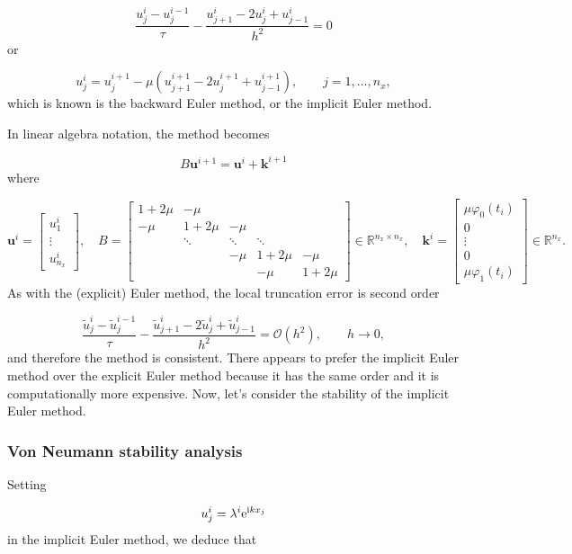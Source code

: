 \documentclass[12pt,a4paper]{article}
\begin{document}
\[
\frac{u^{i}_j - u^{i-1}_j}{\tau} - \frac{u^{i}_{j+1} - 2u^i_j + u^i_{j-1}}{h^2} = 0
\]
or

\[
u^{i}_j = u^{i+1}_j - \mu \left( u^{i+1}_{j+1} - 2u^{i+1}_j + u^{i+1}_{j-1}  \right), \qquad j = 1, \ldots, n_x,
\]
which is known is the backward Euler method, or the implicit Euler method.

In linear algebra notation, the method becomes

\[
B\mathbf{u}^{i+1} = \mathbf{u}^i + \mathbf{k}^{i+1}
\]
where

\[
\mathbf{u}^i = \begin{bmatrix}
u^{i}_{1} \\
\vdots \\
u^{i}_{n_x}
\end{bmatrix}, \quad  B = \begin{bmatrix}
1 + 2\mu & -\mu & & & \\
-\mu  & 1+2\mu & -\mu  & & \\
      & \ddots & \ddots & \ddots & \\
      &        & -\mu    & 1+ 2\mu & -\mu \\
      &        &        &-\mu      & 1+2\mu
\end{bmatrix} \in \mathbb{R}^{n_x \times n_x}, \quad \mathbf{k}^i=
\begin{bmatrix}
\mu\varphi_0(t_i) \\
0 \\
\vdots \\
0 \\
\mu \varphi_1(t_i)
\end{bmatrix} \in \mathbb{R}^{n_x}.
\]
As with the (explicit) Euler method, the local truncation error is second order

\[
\frac{\tilde{u}^{i}_j - \tilde{u}^{i-1}_j}{\tau} - \frac{\tilde{u}^{i}_{j+1} - 2\tilde{u}^i_j + \tilde{u}^i_{j-1}}{h^2} =  \mathcal{O}(h^2), \qquad h \to 0,
\]
and therefore the method is consistent.  There appears to prefer the implicit Euler method over the explicit Euler method because it has the same order and it is computationally more expensive.   Now, let's consider the stability of the implicit Euler method. 

\subsubsection{Von Neumann stability analysis}
Setting

\[
u^i_j = \lambda^i{\rm e}^{{\rm i}k x_j}
\]
in the implicit Euler method, we deduce that
\end{document}
